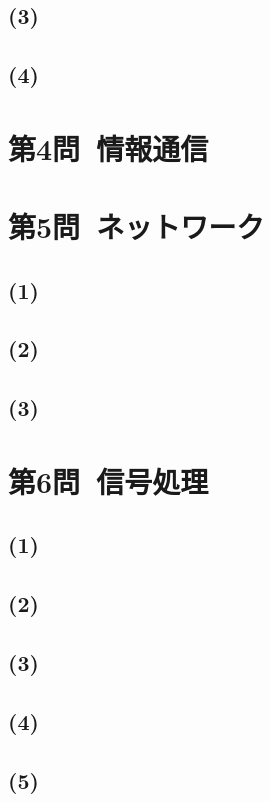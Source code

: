 \documentclass[a4paper,12pt,xelatex,ja=standard]{bxjsarticle}
\begin{document}
\subsection*{(3)}

\subsection*{(4)}

\section*{第4問\ 情報通信}

\section*{第5問\ ネットワーク}
\subsection*{(1)}

\subsection*{(2)}

\subsection*{(3)}

\section*{第6問\ 信号処理}
\subsection*{(1)}

\subsection*{(2)}

\subsection*{(3)}

\subsection*{(4)}

\subsection*{(5)}
\end{document}
